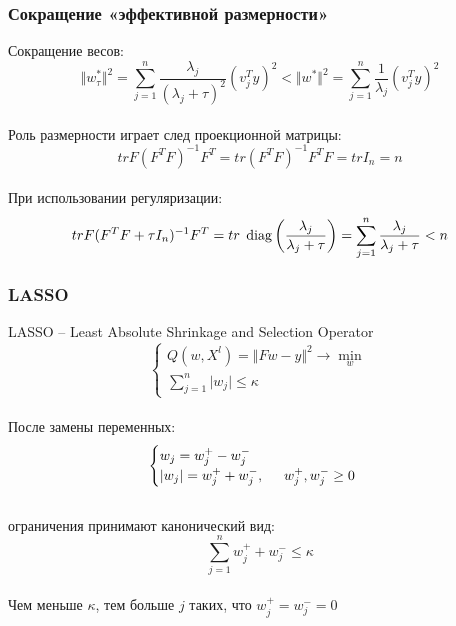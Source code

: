 \documentclass[10pt]{beamer}
\begin{document}
\begin{frame}\frametitle{Сокращение «эффективной размерности»}
	Сокращение весов:\\
	$$\Vert w_{\tau}^* \Vert^2 = \sum\limits_{j=1}^n \frac{\lambda_j}{(\lambda_j + \tau)^2} (v^T_j y)^2 < \Vert w^* \Vert^2  = \sum\limits_{j=1}^n \frac{1}{\lambda_j} (v_j^Ty)^2$$\\
	Роль размерности играет след проекционной матрицы:\\
	$$tr F(F^TF)^{-1}F^T = tr(F^TF)^{-1}F^TF = tr I_n = n$$\\
	При использовании регуляризации:\\
	$$tr F(F^TF + \tau I_n)^{-1}F^T = tr \hspace{1mm}  \operatorname{diag} \left(\frac{\lambda_j}{\lambda_j + \tau}\right)= \sum\limits_{j=1}^n \frac{\lambda_j}{\lambda_j + \tau } < n $$
\end{frame}

\begin{frame}\frametitle{LASSO}
	LASSO -- Least Absolute Shrinkage and Selection Operator\\
	$$
	\begin{cases} Q(w,X^l) = \Vert Fw - y \Vert^2 \rightarrow \min\limits_{w} \\
	\sum_{j=1}^n \vert w_j \vert \leq \kappa
	\end{cases}
	$$\\
	После замены переменных:\\
	$$
	\begin{cases} w_j = w_j^+ - w_j^-\\
	\vert w_j \vert = w_j^+ + w_j^-, \hspace{5mm} w_j^+, w_j^- \geq 0\\
	
	\end{cases}
	$$\\
	ограничения принимают канонический вид:\\
	$$\sum\limits_{j=1}^n w_j^+ + w_j^- \leq \kappa$$\\
	Чем меньше $\kappa$, тем больше $j$ таких, что $w_j^+ = w_j^- = 0$\\
\end{frame}
\end{document}
